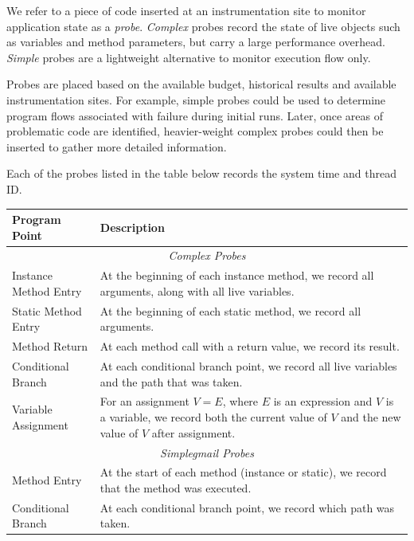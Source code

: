 {We refer to a piece of code inserted at an instrumentation site to monitor
application state as a \textit{probe}. \textit{Complex} probes record the
state of live objects such as variables and method parameters, but carry a large
performance overhead. \textit{Simple} probes are a lightweight alternative to
monitor execution flow only.

Probes are placed based on the available budget, historical results and
available instrumentation sites. For example, simple probes could be used to
determine program flows associated with failure during initial runs. Later,
once areas of problematic code are identified, heavier-weight complex probes
could then be inserted to gather more detailed information.

Each of the probes listed in the table below records the system time and thread
ID.

\begin{center}
    \begin{tabular}{| l | p{6cm} |}
    \hline
        \textbf{Program Point} & \textbf{Description} \\
    \hline
        \multicolumn{2}{|c|}{\textit{Complex Probes}} \\
    \hline
        Instance Method Entry &
        At the beginning of each instance method, we record all arguments, along
        with all live variables. \\
    \hline
    		Static Method Entry &
        At the beginning of each static method, we record all arguments. \\
    \hline
        Method Return &
        At each method call with a return value, we record its result. \\
    \hline
        Conditional Branch &
        At each conditional branch point, we record all live variables and the
        path that was taken. \\
    \hline
        Variable Assignment &
        For an assignment $V = E$, where $E$ is an expression and $V$ is a
        variable, we record both the current value of $V$ and the new value of
        $V$ after assignment. \\
    \hline
        \multicolumn{2}{|c|}{\textit{Simplegmail Probes}} \\
    \hline
        Method Entry &
        At the start of each method (instance or static), we record that the
        method was executed. \\
    \hline
    		Conditional Branch &
        At each conditional branch point, we record which path was taken. \\
    \hline


\end{tabular}
\end{center}}
